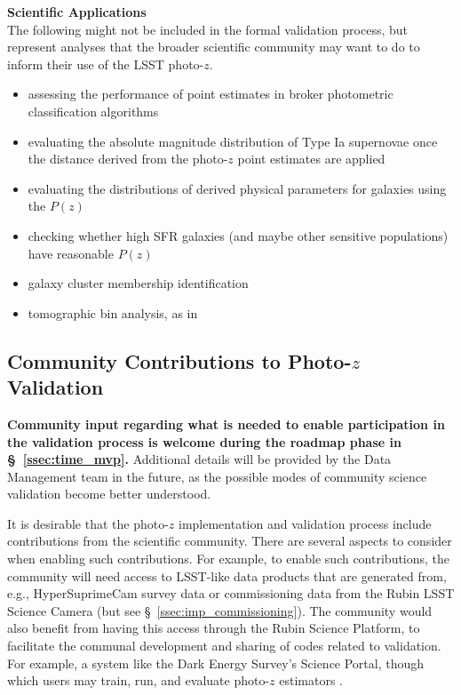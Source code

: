 \documentclass[DM,lsstdraft,toc]{lsstdoc}
\begin{document}
{\bf Scientific Applications}\\
The following might not be included in the formal validation process, but represent analyses that the broader scientific community may want to do to inform their use of the LSST photo-$z$.
\vspace{-15pt}
\begin{itemize}
\item assessing the performance of point estimates in broker photometric classification algorithms
\item evaluating the absolute magnitude distribution of Type Ia supernovae once the distance derived from the photo-$z$ point estimates are applied
\item evaluating the distributions of derived physical parameters for galaxies using the $P(z)$
\item checking whether high SFR galaxies (and maybe other sensitive populations) have reasonable $P(z)$
\item galaxy cluster membership identification
\item tomographic bin analysis, as in \citep{2019MNRAS.482.2807C}
\end{itemize}


\subsection{Community Contributions to Photo-$z$ Validation}\label{ssec:imp_community}

{\bf Community input regarding what is needed to enable participation in the validation process is welcome during the roadmap phase in \S~\ref{ssec:time_mvp}.} Additional details will be provided by the Data Management team in the future, as the possible modes of community science validation become better understood.

It is desirable that the photo-$z$ implementation and validation process include contributions from the scientific community.
There are several aspects to consider when enabling such contributions.
For example, to enable such contributions, the community will need access to LSST-like data products that are generated from, e.g., HyperSuprimeCam survey data or commissioning data from the Rubin LSST Science Camera (but see \S~\ref{ssec:imp_commissioning}).
The community would also benefit from having this access through the Rubin Science Platform, to facilitate the communal development and sharing of codes related to validation.
For example, a system like the Dark Energy Survey's Science Portal, though which users may train, run, and evaluate photo-$z$ estimators \citet{2018A&C....25...58G}.
\end{document}
